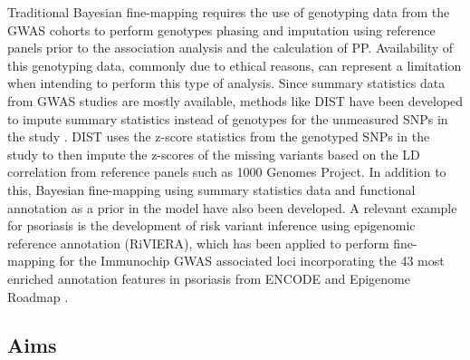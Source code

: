 Traditional Bayesian fine-mapping requires the use of genotyping data from the GWAS cohorts to perform genotypes phasing and imputation using reference panels prior to the association analysis and the calculation of PP. Availability of this genotyping data, commonly due to ethical reasons, can represent a limitation when intending to perform this type of analysis. Since summary statistics data from GWAS studies are mostly available, methods like DIST have been developed to impute summary statistics instead of genotypes for the unmeasured SNPs in the study \parencite{Lee2013}. DIST uses the z-score statistics from the genotyped SNPs in the study to then impute the z-scores of the missing variants based on the LD correlation from reference panels such as 1000 Genomes Project. In addition to this, Bayesian fine-mapping using summary statistics data and functional annotation as a prior in the model have also been developed. A relevant example for psoriasis is the development of risk variant inference using epigenomic reference annotation (RiVIERA), which has been applied to perform fine-mapping for the Immunochip GWAS associated loci incorporating the 43 most enriched annotation features in psoriasis from ENCODE and Epigenome Roadmap \parencite{Li2016}. 
















\subsection{Aims}


